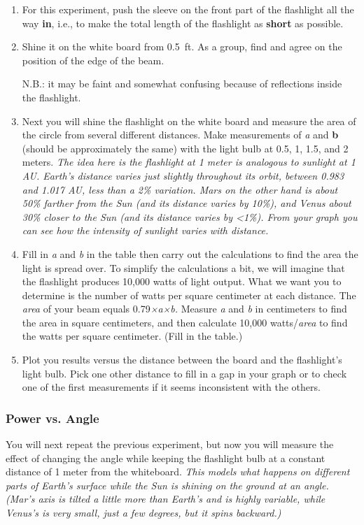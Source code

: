 \documentclass[main.tex]{subfiles}
\begin{document}
\begin{enumerate}[1.]
\item For this experiment, push the sleeve on the front part of the flashlight all the way \textbf{in}, i.e., to make the total length of the flashlight as \textbf{short} as possible.

\item Shine it on the white board from \SI{0.5}{ft}. As a group, find and agree on the position of the edge of the beam.

N.B.: it may be faint and somewhat confusing because of reflections inside the flashlight.

\item Next you will shine the flashlight on the white board and measure the area of the circle from several different distances. Make measurements of \textit{a} and \textbf{b} (should be approximately the same) with the light bulb at 0.5, 1, 1.5, and 2 meters. \textit{The idea here is the flashlight at 1 meter is analogous to sunlight at 1 AU. Earth's distance varies just slightly throughout its orbit, between 0.983 and 1.017 AU, less than a 2\% variation. Mars on the other hand is about 50\% farther from the Sun (and its distance varies by 10\%), and Venus about 30\% closer to the Sun (and its distance varies by <1\%). From your graph you can see how the intensity of sunlight varies with distance.}

\item Fill in \textit{a} and \textit{b} in the table then carry out the calculations to find the area the light is spread over. To simplify the calculations a bit, we will imagine that the flashlight produces 10,000 watts of light output. What we want you to determine is the number of watts per square centimeter at each distance. The \textit{area} of your beam equals 0.79\textit{×a×b.} Measure \textit{a} and \textit{b} in centimeters to find the area in square centimeters, and then calculate 10,000 watts/\textit{area} to find the watts per square centimeter. (Fill in the table.) 
\item Plot you results versus the distance between the board and the flashlight's light bulb. Pick one other distance to fill in a gap in your graph or to check one of the first measurements if it seems inconsistent with the others.

\end{enumerate}

\subsubsection{Power vs. Angle}
You will next repeat the previous experiment, but now you will measure the effect of changing the angle while keeping the flashlight bulb at a constant distance of 1 meter from the whiteboard. \textit{This models what happens on different parts of Earth's surface while the Sun is shining on the ground at an angle. (Mar's axis is tilted a little more than Earth's and is highly variable, while Venus's is very small, just a few degrees, but it spins backward.)}
\end{document}
